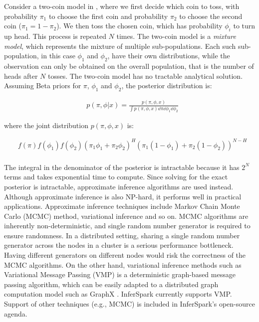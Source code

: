 Consider a two-coin model in , where we first decide
which coin to toss, with probability $\pi_1$ to choose the first coin and
probability $\pi_2$ to choose the second coin ($\pi_1 = 1 - \pi_2$). 
We then toss the chosen coin, which has probability $\phi_i$ to turn up head. 
This process is repeated $N$ times. The two-coin model is
a {\em mixture model}, which represents the
mixture of multiple sub-populations. Each such sub-population, in this case
$\phi_1$ and $\phi_2$, have their own distributions, 
while the observation can only be obtained on the overall population, that is
the number of heads after $N$ tosses. 
The two-coin model has no tractable analytical solution. 
Assuming Beta priors for $\pi$, $\phi_{1}$ and $\phi_{2}$, 
the posterior distribution is:

{
\small
\begin{align*}
	&p(\pi, \phi | x) = \frac{p(\pi, \phi, x)}{\int p(\pi, \phi, x) \dd \pi \dd
\phi_1 \dd \phi_2}
\end{align*}
}

\noindent
where the joint distribution $p(\pi, \phi, x)$ is:

{\small
\begin{align*}
	&f(\pi)f(\phi_1)f(\phi_2)(\pi_1 \phi_1 + \pi_2 \phi_2)^H (\pi_1
	(1-\phi_1) + \pi_2 (1- \phi_2))^{N-H} \\
\end{align*}
}


The integral in the denominator of the posterior is intractable 
because it has $2^N$ terms and takes exponential time to compute.  
Since solving for the exact posterior is
intractable, approximate inference algorithms are used instead.
Although approximate inference is also NP-hard, it performs well in 
practical applications. 
Approximate inference techniques include Markov Chain Monte Carlo (MCMC) 
method, variational inference and so on.
MCMC algorithms are inherently non-deterministic, and single random number
generator is required to ensure randomness. In a distributed setting, sharing
a single random number generator across the nodes in a cluster is a serious
performance bottleneck. Having different generators on different nodes would
risk the correctness of the MCMC algorithms.
On the other hand, variational inference methods such as
Variational Message Passing (VMP) \cite{vmp}
is a deterministic graph-based message passing algorithm, 
which can be easily adapted to a distributed graph computation model such as
GraphX \cite{graphX}. 
InferSpark currently supports VMP.
Support of other techniques (e.g., MCMC) is included in InferSpark's open-source agenda.


